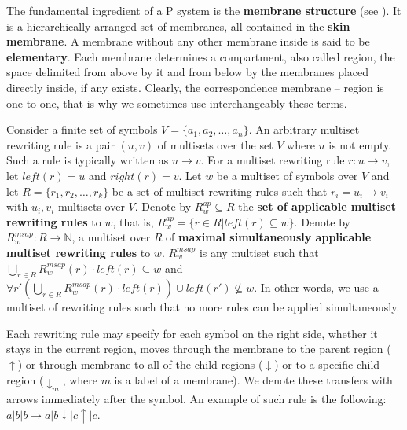 \documentclass[llncs,submission,copyright,creativecommons]{../lib/lncs/llncs}
\begin{document}


The fundamental ingredient of a P system is the {\bf membrane structure} (see \cite{Paun2006Introduction}). It is a hierarchically arranged set of membranes, all contained in the {\bf skin membrane}. A membrane without any other membrane inside is said to be {\bf elementary}. Each membrane determines a compartment, also called region, the space delimited from above by it and from below by the membranes placed directly inside, if any exists. Clearly, the correspondence membrane – region is one-to-one, that is why we sometimes use interchangeably these terms.


Consider a finite set of symbols $V=\{a_1, a_2,\dots, a_n\}$. An arbitrary multiset rewriting rule is a pair $(u, v)$ of multisets over the set $V$ where $u$ is not empty. Such a rule is typically written as $u\rightarrow v$. For a multiset rewriting rule $r : u\rightarrow v$, let $left(r) = u$ and $right(r) = v$. Let $w$ be a multiset of symbols over $V$ and let $R=\{r_1, r_2,\dots, r_k\}$ be a set of multiset rewriting rules such that $r_i = u_i\rightarrow v_i$ with $u_i, v_i$ multisets over $V$. Denote by $R^{ap}_w\subseteq R$ the {\bf set of applicable multiset rewriting rules} to $w$, that is, $R^{ap}_w = \{r\in R|left(r)\subseteq w\}$. Denote by $R^{msap}_w: R\rightarrow \mathbb N$, a multiset over $R$ of {\bf maximal simultaneously applicable multiset rewriting rules} to $w$. $R^{msap}_w$ is any multiset such that $\displaystyle\bigcup_{r\in R} R^{msap}_w(r)\cdot left(r)\subseteq w$ and $\forall r' \left(\displaystyle\bigcup_{r\in R} R^{msap}_w(r)\cdot left(r)\right)\cup left(r')\nsubseteq w$. In other words, we use a multiset of rewriting rules such that no more rules can be applied simultaneously.



  
Each rewriting rule may specify for each symbol on the right side,
whether it stays in the current region,
moves through the membrane to the parent region ($\uparrow$)
or through membrane to all of the child regions ($\downarrow$)
or to a specific child region ($\downarrow_m$, where $m$ is a label of a membrane).
We denote these transfers with arrows immediately after the symbol.
An example of such rule is the following: $a|b|b\rightarrow a|b\downarrow |c\uparrow|c$.
\end{document}
